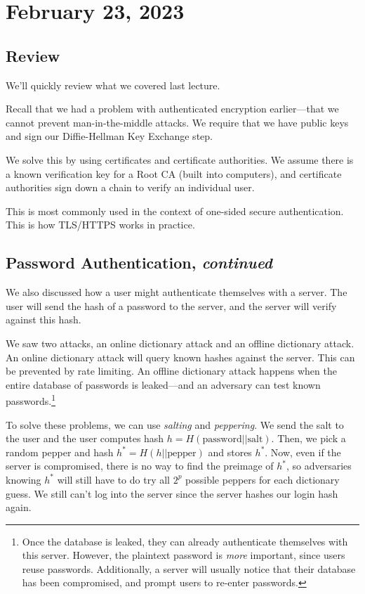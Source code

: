 \section{February 23, 2023}
\label{20230223}
\subsection{Review}
We'll quickly review what we covered last lecture.

Recall that we had a problem with authenticated encryption earlier---that we cannot prevent man-in-the-middle attacks. We require that we have public keys and sign our Diffie-Hellman Key Exchange step.


We solve this by using certificates and certificate authorities. We assume there is a known verification key for a Root CA (built into computers), and certificate authorities sign down a chain to verify an individual user.

This is most commonly used in the context of one-sided secure authentication. This is how TLS/HTTPS works in practice.

\subsection{Password Authentication, \emph{continued}}

We also discussed how a user might authenticate themselves with a server. The user will send the hash of a password to the server, and the server will verify against this hash.

We saw two attacks, an online dictionary attack and an offline dictionary attack. An online dictionary attack will query known hashes against the server. This can be prevented by rate limiting. An offline dictionary attack happens when the entire database of passwords is leaked---and an adversary can test known passwords.\footnote{Once the database is leaked, they can already authenticate themselves with this server. However, the plaintext password is \emph{more} important, since users reuse passwords. Additionally, a server will usually notice that their database has been compromised, and prompt users to re-enter passwords.}


To solve these problems, we can use \emph{salting} and \emph{peppering}. We send the salt to the user and the user computes hash $h = H(\mathrm{password}||\mathrm{salt})$. Then, we pick a random pepper and hash $h^* = H(h||\mathrm{pepper})$ and stores $h^*$. Now, even if the server is compromised, there is no way to find the preimage of $h^*$, so adversaries knowing $h^*$ will still have to do try all $2^p$ possible peppers for each dictionary guess. We still can't log into the server since the server hashes our login hash again.

